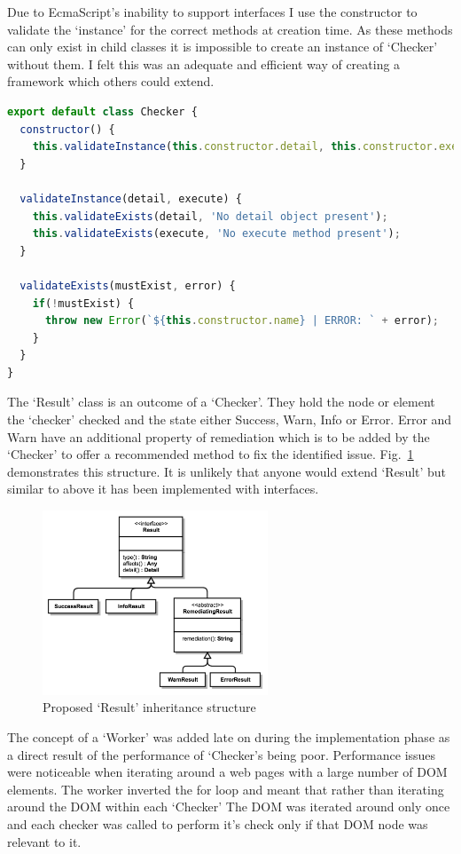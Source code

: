 Due to EcmaScript's inability to support interfaces I use the constructor to
validate the `instance' for the correct methods at creation time. As these
methods can only exist in child classes it is impossible to create an
instance of `Checker' without them. I felt this was an adequate and efficient
way of creating a framework which others could extend.

\begin{lstlisting}[language=JavaScript]
export default class Checker {
  constructor() {
    this.validateInstance(this.constructor.detail, this.constructor.execute);
  }

  validateInstance(detail, execute) {
    this.validateExists(detail, 'No detail object present');
    this.validateExists(execute, 'No execute method present');
  }

  validateExists(mustExist, error) {
    if(!mustExist) {
      throw new Error(`${this.constructor.name} | ERROR: ` + error);
    }
  }
}
\end{lstlisting}

The `Result' class is an outcome of a `Checker'. They hold the node or element
the `checker' checked and the state either Success, Warn, Info or Error.
Error and Warn have an additional property of
remediation which is to be added by the `Checker' to offer a recommended
method to fix the identified issue. Fig.~\ref{fig:result_design} demonstrates
this structure. It is unlikely that anyone would extend `Result' but similar
to above it has been implemented with interfaces.

\begin{figure}[H]
\centering
\includegraphics[width=0.6\textwidth]{figures/a11y_tool_result}
\captionsetup{justification=centering}
\caption{Proposed `Result' inheritance structure
\label{fig:result_design}}
\end{figure}

The concept of a `Worker' was added late on during the implementation phase as a
direct result of the performance of `Checker's being poor. Performance issues
were noticeable when iterating around a web pages with a large number of DOM
elements. The worker inverted the for loop and meant that
rather than iterating around the DOM within each `Checker' The DOM was
iterated around only once and each checker was called to perform it's check
only if that DOM node was relevant to it.

